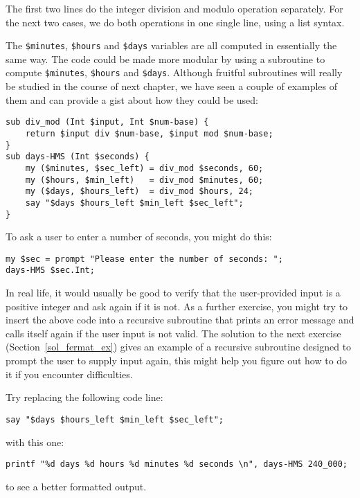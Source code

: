 The first two lines do the integer division and modulo 
operation separately. For the next two cases, we do both 
operations in one single line, using a list syntax.

The \verb'$minutes', \verb'$hours' and \verb'$days' variables 
are all computed in essentially the same way. The code could 
be made more modular by  using a subroutine to compute 
\verb'$minutes', \verb'$hours' and \verb'$days'. Although 
fruitful subroutines will really be studied in the course 
of next chapter, we have seen a couple of examples of 
them and can provide a gist about how they could be used:

\begin{verbatim}
sub div_mod (Int $input, Int $num-base) {
    return $input div $num-base, $input mod $num-base;
}
sub days-HMS (Int $seconds) {
    my ($minutes, $sec_left) = div_mod $seconds, 60;
    my ($hours, $min_left)   = div_mod $minutes, 60;
    my ($days, $hours_left)  = div_mod $hours, 24;
    say "$days $hours_left $min_left $sec_left"; 
}
\end{verbatim}

To ask a user to enter a number of seconds, you might 
do this:

\begin{verbatim}
my $sec = prompt "Please enter the number of seconds: ";
days-HMS $sec.Int;
\end{verbatim}

In real life, it would usually be good to verify that the 
user-provided input is a positive integer and ask again if it is 
not. As a further exercise, you might try to insert the 
above code into a recursive subroutine that prints an 
error message and calls itself again if the user input is 
not valid. The solution to the next exercise 
(Section~\ref{sol_fermat_ex}) gives an example of a recursive 
subroutine designed to prompt 
the user to supply input again, this might help you figure 
out how to do it if you encounter difficulties. 

Try replacing the following code line:
\begin{verbatim}
say "$days $hours_left $min_left $sec_left"; 
\end{verbatim}
%
with this one:

\begin{verbatim}
printf "%d days %d hours %d minutes %d seconds \n", days-HMS 240_000;
\end{verbatim}
to see a better formatted output.


